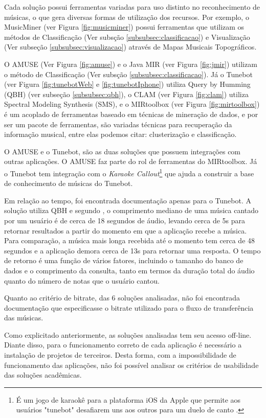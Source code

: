 Cada solução possui ferramentas variadas para uso distinto no reconhecimento de músicas, o que gera diversas formas de utilização dos recursos. Por exemplo, o MusicMiner (ver Figura \ref{fig:musicminer}) possui ferramentas que utilizam os métodos de Classificação (Ver subsção \ref{subsubsec:classificacao}) e Visualização (Ver subseção \ref{subsubsec:visualizacao}) através de Mapas Musicais Topográficos.

O AMUSE (Ver Figura \ref{fig:amuse}) e o Java MIR (ver Figura \ref{fig:jmir}) utilizam o método de Classificação (Ver subsção \ref{subsubsec:classificacao}). Já o Tunebot (ver Figura \ref{fig:tunebotWeb} e \ref{fig:tunebotIphone}) utiliza Query by Humming (QBH) (ver subseção \ref{subsubsec:qbh}), o CLAM (ver Figura \ref{fig:clam}) utiliza Spectral Modeling Synthesis (SMS), e o MIRtoolbox (ver Figura \ref{fig:mirtoolbox}) é um acoplado de ferramentas baseado em técnicas de mineração de dados, e por ser um pacote de ferramentas, são variadas técnicas para recuperação da informação musical, entre elas podemos citar: clusterização e classificação.

O AMUSE e o Tunebot, são as duas soluções que possuem integrações com outras aplicações. O AMUSE faz parte do rol de ferramentas do MIRtoolbox. Já o Tunebot tem integração com o \textit{Karaoke Callout}\footnote{É um jogo de karaokê para a plataforma iOS da Apple que permite aos usuários "tunebot" desafiarem uns aos outros para um duelo de canto \cite{karaokeCallout2006}.} que ajuda a construir a base de conhecimento de músicas do Tunebot.

Em relação ao tempo, foi encontrada documentação apenas para o Tunebot. A solução utiliza QBH e segundo , o comprimento mediano de uma música cantado por um usuário é de cerca de 18 segundos de áudio, levando cerca de 5s para retornar resultados a partir do momento em que a aplicação recebe a música. Para comparação, a música mais longa recebida até o momento tem cerca de 48 segundos e a aplicação demora cerca de 13s para retornar uma resposta. O tempo de retorno é uma função de vários fatores, incluindo o tamanho do banco de dados e o comprimento da consulta, tanto em termos da duração total do áudio quanto do número de notas que o usuário cantou.

Quanto ao critério de bitrate, das 6 soluções analisadas, não foi encontrada documentação que especificasse o bitrate utilizado para o fluxo de transferência das músicas.

Como explicitado anteriormente, as soluções analisadas tem seu acesso off-line. Diante disso, para o funcionamento correto de cada aplicação é necessário a instalação de projetos de terceiros. Desta forma, com a impossibilidade de funcionamento das aplicações, não foi possível analisar os critérios de usabilidade das soluções acadêmicas.


